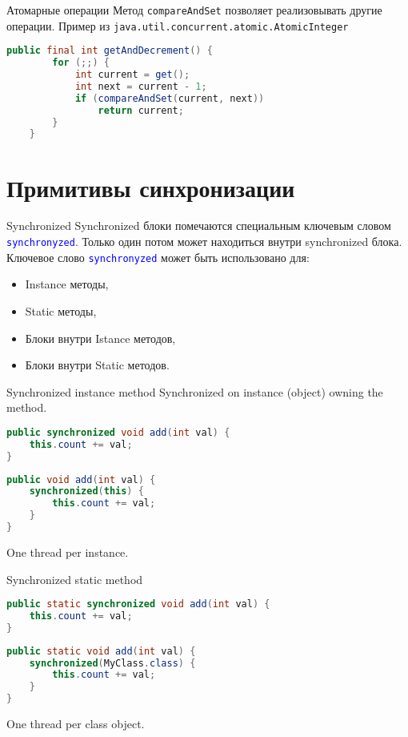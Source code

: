 \begin{frame}[fragile]{Атомарные операции}
Метод \texttt{compareAndSet} позволяет реализовывать другие операции.
\vfill
Пример из \texttt{java.util.concurrent.atomic.AtomicInteger}
\begin{lstlisting}[language=Java]
public final int getAndDecrement() {
        for (;;) {
            int current = get();
            int next = current - 1;
            if (compareAndSet(current, next))
                return current;
        }
    }
\end{lstlisting}
\end{frame}

\section{Примитивы синхронизации}

\begin{frame}{Synchronized}
Synchronized блоки помечаются специальным ключевым словом \textcolor{blue}{\texttt{synchronyzed}}.
\vfill
Только один потом может находиться внутри synchronized блока.
\vfill
Ключевое слово \textcolor{blue}{\texttt{synchronyzed}} может быть использовано для:
\begin{itemize}
    \item Instance методы,
    \item Static методы,
    \item Блоки внутри Istance методов,
    \item Блоки внутри Static методов.
\end{itemize}
\end{frame}

\begin{frame}[fragile]{Synchronized instance method}
Synchronized on instance (object) owning the method.
\vfill
\begin{lstlisting}[language=Java]
public synchronized void add(int val) {
    this.count += val;
}
\end{lstlisting}
\vfill
\begin{lstlisting}[language=Java]
public void add(int val) {
    synchronized(this) {
        this.count += val;
    }
}
\end{lstlisting}
\vfill
One thread per instance.
\end{frame}

\begin{frame}[fragile]{Synchronized static method}
\begin{lstlisting}[language=Java]
public static synchronized void add(int val) {
    this.count += val;
}
\end{lstlisting}
\vfill
\begin{lstlisting}[language=Java]
public static void add(int val) {
    synchronized(MyClass.class) {
        this.count += val;
    }
}
\end{lstlisting}
\vfill
One thread per class object.
\end{frame}

